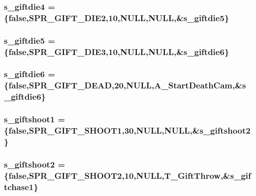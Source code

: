 \label{WL__ACT2_8C_a91242714b9b95d199688bfcd64cc28a0}
\hypertarget{WL__ACT2_8C_a098d4de348bb27933dd912e540f12dc8}{
\subsubsection[{s\_\-giftdie4}]{ {\bf s\_\-giftdie4} = \{false,SPR\_\-GIFT\_\-DIE2,10,NULL,NULL,\&{\bf s\_\-giftdie5}\}}}
\label{WL__ACT2_8C_a098d4de348bb27933dd912e540f12dc8}
\hypertarget{WL__ACT2_8C_ae6f8e4ed029fb6484ffcb166beed76c3}{
\subsubsection[{s\_\-giftdie5}]{ {\bf s\_\-giftdie5} = \{false,SPR\_\-GIFT\_\-DIE3,10,NULL,NULL,\&{\bf s\_\-giftdie6}\}}}
\label{WL__ACT2_8C_ae6f8e4ed029fb6484ffcb166beed76c3}
\hypertarget{WL__ACT2_8C_a42ba26ddb8a99b9acba9da4f7ee59a3b}{
\subsubsection[{s\_\-giftdie6}]{ {\bf s\_\-giftdie6} = \{false,SPR\_\-GIFT\_\-DEAD,20,NULL,A\_\-StartDeathCam,\&{\bf s\_\-giftdie6}\}}}
\label{WL__ACT2_8C_a42ba26ddb8a99b9acba9da4f7ee59a3b}
\hypertarget{WL__ACT2_8C_ad9108b8c8f5c7451a5025f1f7372b0ef}{
\subsubsection[{s\_\-giftshoot1}]{ {\bf s\_\-giftshoot1} = \{false,SPR\_\-GIFT\_\-SHOOT1,30,NULL,NULL,\&{\bf s\_\-giftshoot2}\}}}
\label{WL__ACT2_8C_ad9108b8c8f5c7451a5025f1f7372b0ef}
\hypertarget{WL__ACT2_8C_a5014213e30afa37b5bfd50bbd77a2a38}{
\subsubsection[{s\_\-giftshoot2}]{ {\bf s\_\-giftshoot2} = \{false,SPR\_\-GIFT\_\-SHOOT2,10,NULL,T\_\-GiftThrow,\&{\bf s\_\-giftchase1}\}}}
